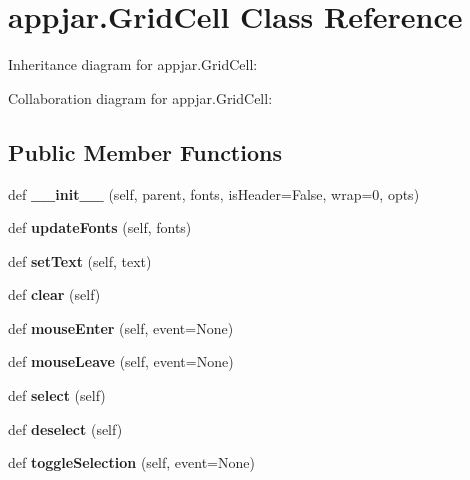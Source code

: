 \hypertarget{classappjar_1_1_grid_cell}{}\section{appjar.\+Grid\+Cell Class Reference}
\label{classappjar_1_1_grid_cell}


Inheritance diagram for appjar.\+Grid\+Cell\+:


Collaboration diagram for appjar.\+Grid\+Cell\+:
\subsection*{Public Member Functions}
\begin{DoxyCompactItemize}
\item 
\mbox{\label{classappjar_1_1_grid_cell_ab6dfb260716e544e8c176e6c38372248}} 
def {\bfseries \+\_\+\+\_\+init\+\_\+\+\_\+} (self, parent, fonts, is\+Header=False, wrap=0, opts)
\item 
\mbox{\label{classappjar_1_1_grid_cell_a0c5e9f5902d21894ac341dbb215d0547}} 
def {\bfseries update\+Fonts} (self, fonts)
\item 
\mbox{\label{classappjar_1_1_grid_cell_a4155eca01600e835ef55ddde4641a311}} 
def {\bfseries set\+Text} (self, text)
\item 
\mbox{\label{classappjar_1_1_grid_cell_ac37dc8a0bb46c85722640893b389e122}} 
def {\bfseries clear} (self)
\item 
\mbox{\label{classappjar_1_1_grid_cell_a1648037e027b10491c7ee63de0cf157e}} 
def {\bfseries mouse\+Enter} (self, event=None)
\item 
\mbox{\label{classappjar_1_1_grid_cell_a7d7163f2fb8269b7f507ed91fd96c9ae}} 
def {\bfseries mouse\+Leave} (self, event=None)
\item 
\mbox{\label{classappjar_1_1_grid_cell_af133c25636e61b647b2f4fdc61be4416}} 
def {\bfseries select} (self)
\item 
\mbox{\label{classappjar_1_1_grid_cell_ae67811b68fc8fae1a65b8d32afb2f2b6}} 
def {\bfseries deselect} (self)
\item 
\mbox{\label{classappjar_1_1_grid_cell_aefb9652406cdadd7d8e70813ff9c1990}} 
def {\bfseries toggle\+Selection} (self, event=None)
\end{DoxyCompactItemize}
